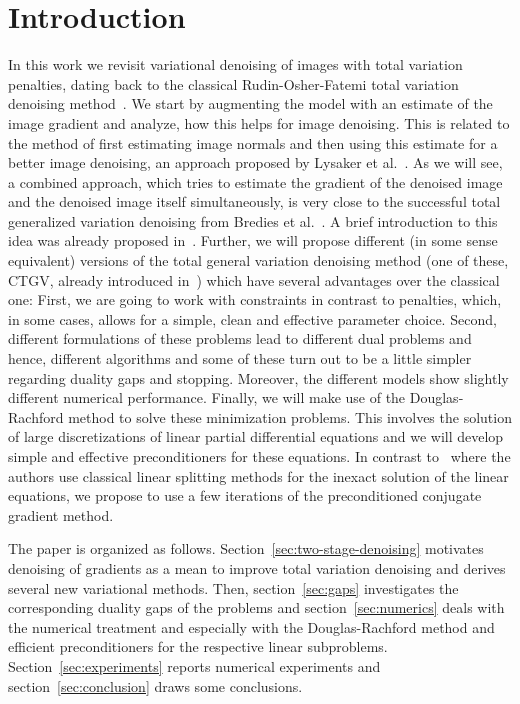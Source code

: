 \documentclass[twocolumn,envcountsame]{svjour3}
\begin{document}
\section{Introduction}
\label{sec:intro}
In this work we revisit variational denoising of images with total variation penalties, dating back to the classical Rudin-Osher-Fatemi total variation denoising method~\cite{rudin1992rofmodel}.
We start by augmenting the model with an estimate of the image gradient and analyze, how this helps for image denoising.
This is related to the method of first estimating image normals and then using this estimate for a better image denoising, an approach proposed by Lysaker et al.~\cite{Lysaker2004}.
As we will see, a combined approach, which tries to estimate the  gradient of the denoised image and the denoised image itself simultaneously, is very close to the successful total generalized variation denoising from Bredies et al.~\cite{bredies2010total}.
A brief introduction to this idea was already proposed in~\cite{komander2017denoising}.
Further, we will propose different (in some sense equivalent) versions of the total general variation denoising method (one of these, CTGV, already introduced in~\cite{komander2017denoising}) which have several advantages over the classical one:
First, we are going to work with constraints in contrast to penalties, which, in some cases, allows for a simple, clean and effective parameter choice.
Second, different formulations of these problems lead to different dual problems and hence, different algorithms and some of these turn out to be a little simpler regarding duality gaps and stopping.
Moreover, the different models show slightly different numerical performance.
Finally, we will make use of the Douglas-Rachford method to solve these minimization problems.
This involves the solution of large discretizations of linear partial differential equations and we
will develop simple and effective preconditioners for these equations.
In contrast to~\cite{bredies2015preconditioned} where the authors use classical linear splitting methods for the inexact
solution of the linear equations, we propose to use a few iterations of the preconditioned conjugate gradient method.


The paper is organized as follows. Section~\ref{sec:two-stage-denoising} motivates denoising of
gradients as a mean to improve total variation denoising and derives several new variational methods. Then, section~\ref{sec:gaps} investigates the corresponding duality gaps of the problems and section~\ref{sec:numerics} deals with the numerical treatment and especially with the Douglas-Rachford method and efficient preconditioners for the respective linear subproblems. Section~\ref{sec:experiments} reports numerical experiments and section~\ref{sec:conclusion} draws some conclusions.
\end{document}
